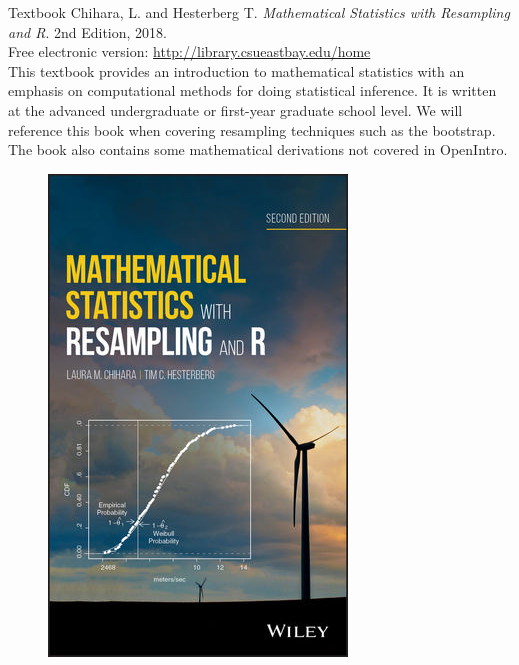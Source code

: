 \documentclass[10pt]{beamer}
\begin{document}
\begin{frame}{Textbook}
Chihara, L. and Hesterberg T. \emph{Mathematical Statistics with Resampling and R}. 2nd Edition, 2018.\\
\vspace{5pt}
Free electronic version: \url{http://library.csueastbay.edu/home}\\
\vspace{10pt}
This textbook provides an introduction to mathematical statistics with an emphasis on computational methods for doing statistical inference.  It is written at the advanced undergraduate or first-year graduate school level.  We will reference this book when covering resampling techniques such as the bootstrap.  The book also contains some mathematical derivations not covered in OpenIntro.
\begin{figure}
\flushright
\includegraphics[scale=0.15]{figure/msr_cover.jpg}
\end{figure}
\end{frame}
\end{document}
